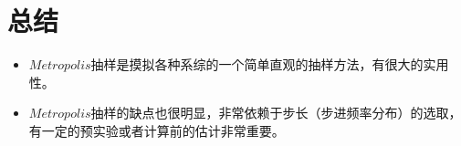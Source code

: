 \documentclass[UTF8]{ctexart}
\begin{document}
	
	
	
	
	

	\section{总结}
	\begin{itemize}
		\item $Metropolis$抽样是摸拟各种系综的一个简单直观的抽样方法，有很大的实用性。
		\item $Metropolis$抽样的缺点也很明显，非常依赖于步长（步进频率分布）的选取，有一定的预实验或者计算前的估计非常重要。
	\end{itemize}
	
\end{document}
